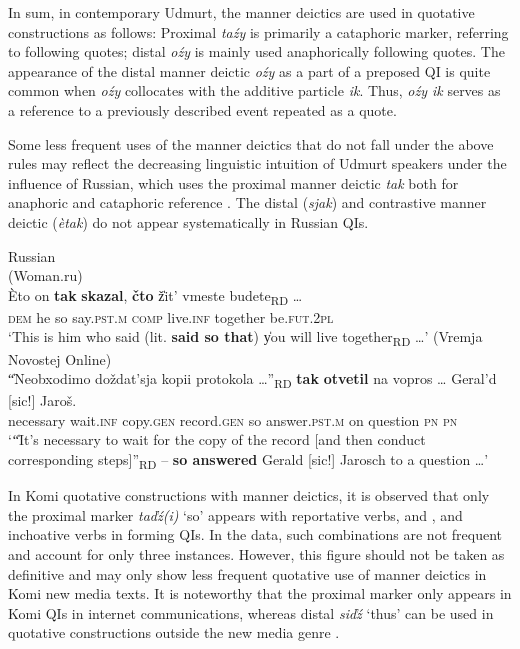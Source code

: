 \documentclass[output=paper,colorlinks,citecolor=brown]{langscibook}
\begin{document}
In sum, in contemporary Udmurt, the manner deictics are used in quotative constructions as follows: Proximal \textit{taźy} is primarily a cataphoric marker, referring to following quotes; distal \textit{oźy} is mainly used anaphorically following quotes. The appearance of the distal manner deictic \textit{oźy} as a part of a preposed QI is quite common when \textit{oźy} collocates with the additive particle \textit{ik}. Thus, \textit{oźy ik} serves as a reference to a previously described event repeated as a quote.

Some less frequent uses of the manner deictics that do not fall under the above rules may reflect the decreasing linguistic intuition of Udmurt speakers under the influence of Russian, which uses the proximal manner deictic \textit{tak} both for anaphoric and cataphoric reference . The distal (\textit{sjak}) and contrastive manner deictic (\textit{ètak}) do not appear systematically in Russian QIs.

\ea\label{ex:teptiuk:17} {Russian}\\
\ea\label{ex:teptiuk:17a} {(Woman.ru)}\\
\gll \`{E}to on \textbf{tak} \textbf{skazal}, \textbf{čto} \|žit’ vmeste budete\|\textsubscript{RD} …\\
 \textsc{dem} he so say.\textsc{pst}.\textsc{m} \textsc{comp} {\db}live.\textsc{inf} together be.\textsc{fut}.2\textsc{pl}\\
\glt ‘This is him who said (lit. \textbf{said so that}) \|you will live together\|\textsubscript{RD} …’
\ex\label{ex:teptiuk:17b} {(Vremja Novostej Online)}\\
\gll \|“Neobxodimo doždat’sja kopii protokola …”\|\textsubscript{RD}  \textbf{tak} \textbf{otvetil} na vopros … Geral’d {[sic!]} Jaroš.\\
{\db}{\db}necessary wait.\textsc{inf} copy.\textsc{gen} record.\textsc{gen} {} so answer.\textsc{pst}.\textsc{m} on question {} \textsc{pn} {} \textsc{pn}\\
\glt ‘\|“It’s necessary to wait for the copy of the record [and then conduct corresponding steps]”\|\textsubscript{RD} – \textbf{so answered} Gerald [sic!] Jarosch to a question …’
\z
\z

In Komi quotative constructions with manner deictics, it is observed that only the proximal marker \textit{taďź(i)} ‘so’ appears with reportative verbs,  and , and inchoative verbs  in forming QIs. In the data, such combinations are not frequent and account for only three instances. However, this figure should not be taken as definitive and may only show less frequent quotative use of manner deictics in Komi new media texts. It is noteworthy that the proximal marker only appears in Komi QIs in internet communications, whereas distal \textit{siďź} ‘thus’ can be used in quotative constructions outside the new media genre .
\end{document}
